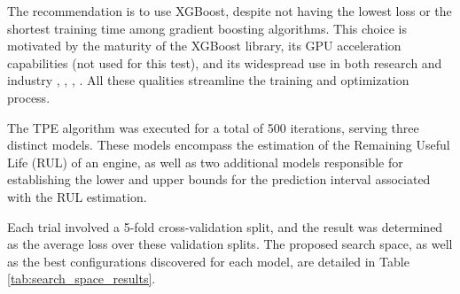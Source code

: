 \documentclass{IEEEtran}
\begin{document}
            The recommendation is to use XGBoost, despite not having the lowest loss or the shortest training time among gradient boosting algorithms. This choice is motivated by the maturity of the XGBoost library, its GPU acceleration capabilities (not used for this test), and its widespread use in both research and industry \cite{wind-xgboost}, \cite{pdm-xgboost}, \cite{shwartz2022tabular}, \cite{grinsztajn2022tree}. All these qualities streamline the training and optimization process.

            The TPE algorithm was executed for a total of 500 iterations, serving three distinct models. These models encompass the estimation of the Remaining Useful Life (RUL) of an engine, as well as two additional models responsible for establishing the lower and upper bounds for the prediction interval associated with the RUL estimation.

            Each trial involved a 5-fold cross-validation split, and the result was determined as the average loss over these validation splits. The proposed search space, as well as the best configurations discovered for each model, are detailed in Table \ref{tab:search_space_results}.
            \begin{table}[H]
                \caption{Hyperparameter Search Space for TPE and results for RUL estimators and, Lower and Upper Bounds.}
                \label{tab:search_space_results}
                \centering
            \end{table}
\end{document}
